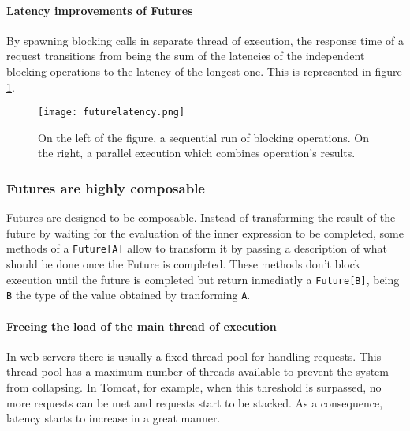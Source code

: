 \documentclass[../main.tex]{subfiles}
\begin{document}
\paragraph{Latency improvements of Futures}

By spawning blocking calls in separate thread of execution, the response time of
a request transitions from being the sum of the latencies of the independent
blocking operations to the latency of the longest one. This is represented in
figure \ref{fig:futurelatency}.

\begin{figure}[ht]
  \centering
  \texttt{[image: futurelatency.png]}
  \caption{\label{fig:futurelatency}
    On the left of the figure, a sequential run of blocking operations. On
    the right, a parallel execution which combines operation's results.
  }
\end{figure}

\subsubsection{Futures are highly composable}
Futures are designed to be composable. Instead of transforming the result of the
future by waiting for the evaluation of the inner expression to be completed,
some methods of a \texttt{Future[A]} allow to transform it by passing a description of what
should be done once the Future is completed. These methods don't block execution until the
future is completed but return inmediatly a \texttt{Future[B]}, being \texttt{B} the type of 
the value obtained by tranforming \texttt{A}.

\paragraph{Freeing the load of the main thread of execution}

In web servers there is usually a fixed thread pool for handling requests. This
thread pool has a maximum number of threads available to prevent the system
from collapsing. In Tomcat, 
for example, when this threshold is surpassed, no more
requests can be met and requests start to be stacked. As a consequence, latency
starts to increase in a great manner.
\end{document}
